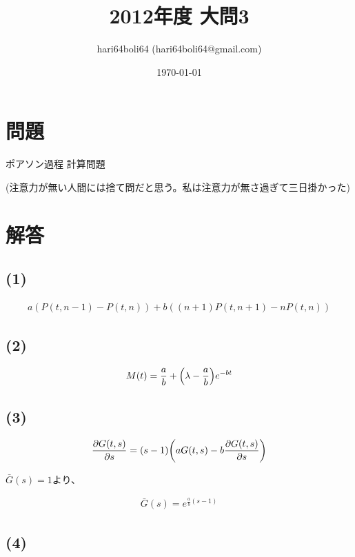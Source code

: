 \documentclass[a4paper, 10pt, dvipdfmx]{jlreq}
\begin{document}
\title{2012年度 大問3}
\author{hari64boli64 (hari64boli64@gmail.com)}
\date{\today}
\maketitle

\section{問題}

ポアソン過程 計算問題

(注意力が無い人間には捨て問だと思う。私は注意力が無さ過ぎて三日掛かった)

\section{解答}

\subsection*{(1)}

\begin{align*}
  a(P(t,n-1)-P(t,n))+b((n+1)P(t,n+1)-nP(t,n))
\end{align*}

\subsection*{(2)}

\begin{align*}
  M(t)=\frac{a}{b}+\qty(\lambda-\frac{a}{b})e^{-bt}
\end{align*}

\subsection*{(3)}

\begin{align*}
  \pdv{G(t,s)}{s}=(s-1)\qty(aG(t,s)-b\pdv{G(t,s)}{s})
\end{align*}

$\bar{G}(s)=1$より、

\begin{align*}
  \bar{G}(s)=e^{\frac{a}{b}(s-1)}
\end{align*}

\subsection*{(4)}
\end{document}
